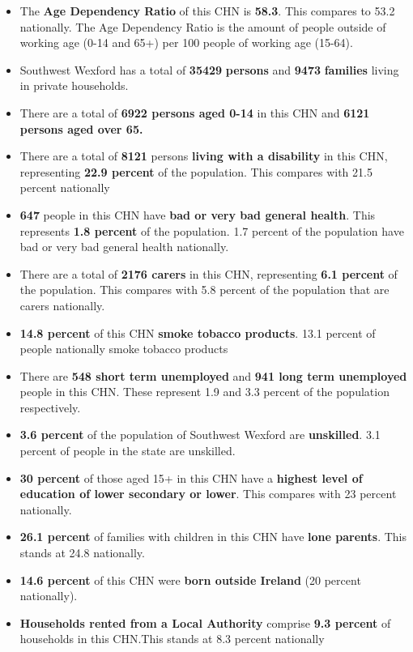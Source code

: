 \documentclass{article}
\begin{document}
\begin{itemize}

\item The \textbf{Age Dependency Ratio} of this CHN is  \textbf{58.3}. This compares to 53.2 nationally. The Age Dependency Ratio is the amount of people outside of working age (0-14 and 65+) per 100 people of working age (15-64). 

\item Southwest Wexford has a total of \textbf{\num{35429}} \textbf{persons} and  \textbf{\num{9473}} \textbf{families} living in private households.

\item There are a total of \textbf{\num{6922} persons aged 0-14} in this CHN and \textbf{\num{6121} persons aged over 65.} 

\item There are a total of \textbf{\num{8121}} persons \textbf{living with a disability} in this CHN, representing \textbf{22.9 percent} of the population. This compares with  21.5 percent nationally

\item \textbf{\num{647}} people in this CHN have \textbf{bad or very bad general health}. This represents \textbf{1.8 percent} of the population. 1.7 percent of the population have bad or very bad general health nationally. 

\item There are a total of \textbf{\num{2176} carers} in this CHN, representing \textbf{6.1 percent} of the population. This compares with 5.8 percent of the population that are carers nationally. 

\item \textbf{14.8 percent} of this CHN \textbf{smoke tobacco products}. 13.1 percent of people nationally smoke tobacco products

\item There are \textbf{\num{548} short term unemployed} and \textbf{\num{941} long term unemployed} people in this CHN. These represent 1.9 and 3.3 percent of the population respectively.

\item  \textbf{3.6 percent} of the population of Southwest Wexford are \textbf{unskilled}. 3.1 percent of people in the state are unskilled.

\item \textbf{30 percent} of those aged 15+ in this CHN have a \textbf{highest level of education of lower secondary or lower}. This compares with 23 percent nationally. 

\item \textbf{26.1 percent} of families with children in this CHN have \textbf{lone parents}. This stands at 24.8 nationally.

\item \textbf{14.6 percent} of this CHN were \textbf{born outside Ireland} (20 percent nationally).

\item \textbf{Households rented from a Local Authority} comprise \textbf{9.3 percent} of households in this CHN.This stands at 8.3 percent nationally

\end{itemize}
\end{document}
